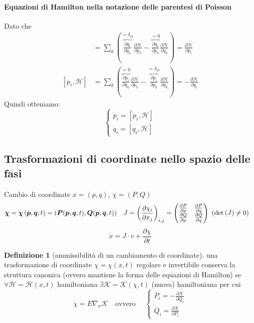 \documentclass[a4paper,10pt]{article}
\theoremstyle{definition}
\newcommand{\bv}{\boldsymbol} %
\theoremstyle{indentdefinition}
\newtheorem{defn}{Definizione}[section]
\theoremstyle{indenttheorem}
\theoremstyle{myremark}
\theoremstyle{indentgeneral}
\begin{document}
\paragraph{Equazioni di Hamilton nella notazione delle parentesi di Poisson}
Dato che 
\begin{align*}
    [q_i,\mathcal{H}]&=\sum_{k}(\overbrace{\frac{\partial q_{i}}{\partial q_{k}}}^{=\delta_{ik}}\frac{\partial\mathcal{H}}{\partial p_{k}}-\overbrace{\frac{\partial q_{i}}{\partial p_{k}}}^{=0}\frac{\partial \mathcal{H}}{\partial q_{k}})=\frac{\partial\mathcal{H}}{\partial p_{i}} \\
      [p_i,\mathcal{H}]&=\sum_{k}(\overbrace{\frac{\partial p_{i}}{\partial q_{k}}}^{=0}\frac{\partial\mathcal{H}}{\partial p_{k}}-\overbrace{\frac{\partial p_{i}}{\partial p_{k}}}^{=\delta_{ik}}\frac{\partial \mathcal{H}}{\partial q_{k}})=-\frac{\partial\mathcal{H}}{\partial q_{i}}
\end{align*}
Quindi otteniamo: 
\[
\begin{cases}
\dot{p}_{i}=\left[p_{i},\mathcal{H}\right]\\
\dot{q}_{i}=\left[q_{i},\mathcal{H}\right]
\end{cases}
\]


\subsection{Trasformazioni di coordinate nello spazio delle fasi}

Cambio di coordinate $x=(p,q)$, $\chi=(P,Q)$
\begin{align*}
\bv{\chi} & =\bv{\chi}\left(\bv{p},\bv{q},t\right)=(\bv{P}(\bv{p},\bv{q},t),\bv{Q}(\bv{p},\bv{q},t)) & J & =\left(\frac{\partial\chi_{i}}{\partial x_{j}}\right)_{i,j}=\begin{pmatrix}\frac{\partial P}{\partial p} & \frac{\partial P}{\partial q}\\
\frac{\partial Q}{\partial p} & \frac{\partial Q}{\partial q}
\end{pmatrix}\text{ (\ensuremath{\det\left(J\right)\neq0})}
\end{align*}
$$ \dot{x}=J\cdot v+\frac{\partial\chi}{\partial t}$$

\begin{defn}[ammissibilità di un cambiamento di coordinate]
una trasformazione di coordinate $\chi=\chi(x,t)$ regolare e invertibile conserva la struttura canonica (ovvero mantiene la forma delle equazioni di Hamilton) se $\forall\mathcal{H}=\mathcal{H}\left(x,t\right)$ hamiltoniana
$\exists\mathcal{K}=\mathcal{K}\left(\chi,t\right)$ (nuova) hamiltoniana
per cui 
\[
\dot{\chi}=E\nabla_{x}\mathcal{K}\quad\text{ovvero } \quad 
\begin{cases}
\dot{P}_{i}=-\frac{\partial\mathcal{K}}{\partial Q_{i}}\\
\dot{Q}_{i}=\frac{\partial\mathcal{K}}{\partial P_{i}}
\end{cases}
\]
\end{defn}
\end{document}
